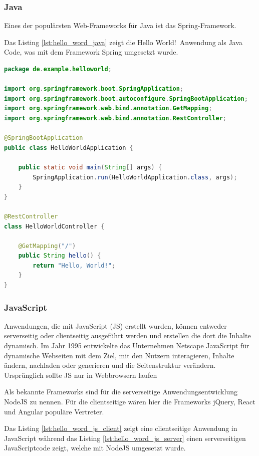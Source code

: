 \subsubsection{Java}

Eines der populärsten Web-Frameworks für Java ist das Spring-Framework.\vspace{0.2cm}

Das Listing \ref{lst:hello_word_java} zeigt die \glqq Hello World!\grqq \ Anwendung als Java Code, was mit dem Framework Spring umgesetzt wurde.

\begin{lstlisting}[language=Java,label=lst:hello_word_java,caption={Hello World in Java}]
package de.example.helloworld;

import org.springframework.boot.SpringApplication;
import org.springframework.boot.autoconfigure.SpringBootApplication;
import org.springframework.web.bind.annotation.GetMapping;
import org.springframework.web.bind.annotation.RestController;

@SpringBootApplication
public class HelloWorldApplication {

    public static void main(String[] args) {
        SpringApplication.run(HelloWorldApplication.class, args);
    }
}

@RestController
class HelloWorldController {

    @GetMapping("/")
    public String hello() {
        return "Hello, World!";
    }
}
\end{lstlisting}


\subsubsection{JavaScript}
Anwendungen, die mit JavaScript (JS) erstellt wurden, können entweder serverseitig oder clientseitig ausgeführt werden und erstellen die dort die Inhalte dynamisch. Im Jahr 1995 entwickelte das Unternehmen Netscape JavaScript für dynamische Webseiten mit dem Ziel, mit den Nutzern interagieren, Inhalte ändern, nachladen oder generieren und die Seitenstruktur verändern. Ursprünglich sollte JS nur in Webbrowsern laufen\vspace{0.2cm}

Als bekannte Frameworks sind für die serverseitige Anwendungsentwicklung NodeJS zu nennen. Für die clientseitige wären hier die Frameworks jQuery, React und Angular populäre Vertreter.\vspace{0.2cm}


Das Listing \ref{lst:hello_word_js_client} zeigt eine clientseitige Anwendung in JavaScript während das Listing \ref{lst:hello_word_js_server} einen serverseitigen JavaScriptcode zeigt, welche mit NodeJS umgesetzt wurde.

